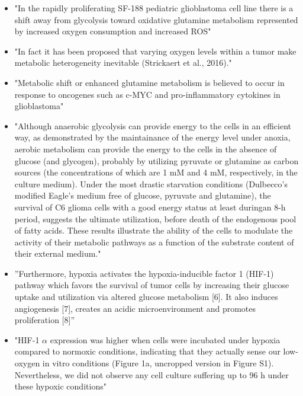 \documentclass[11pt,a4paper]{article}
\begin{document}
\begin{itemize}
\item "In the rapidly proliferating SF-188 pediatric glioblastoma cell line there is a shift away from glycolysis toward oxidative glutamine metabolism represented by increased oxygen consumption and increased ROS"\cite{Strickland2017}

\item "In fact it has been proposed that varying oxygen levels within a tumor make metabolic heterogeneity inevitable (Strickaert et al., 2016)."\cite{Strickland2017}

\item "Metabolic shift or enhanced glutamine metabolism is believed to occur in response to oncogenes such as c-MYC and pro-inflammatory cytokines in glioblastoma" \cite{Stuart2023}

\item "Although anaerobic glycolysis can provide energy to the cells in an efficient way, as demonstrated by the maintainance of the energy level under anoxia, aerobic metabolism can provide the energy to the cells in the absence of glucose (and glycogen), probably by utilizing pyruvate or glutamine as carbon sources (the concentrations of which are 1 mM and 4 mM, respectively, in the culture medium). Under the most drastic starvation conditions (Dulbecco’s modified Eagle’s medium free of glucose, pyruvate and glutamine), the survival of C6 glioma cells with a good energy status at least duringan
8-h period, suggests the ultimate utilization, before death of the endogenous pool of fatty acids. These results illustrate the ability of the cells to modulate the activity of their metabolic pathways as a function of the substrate content of their external medium."\cite{Piannet1991}

\item ”Furthermore, hypoxia activates the hypoxia-inducible factor 1 (HIF-1) pathway which favors the survival of tumor cells by increasing their glucose uptake and utilization via altered glucose metabolism [6]. It also induces angiogenesis [7], creates an acidic microenvironment and promotes proliferation [8]”\cite{Shen2018}

\item "HIF-1 $\alpha$ expression was higher when cells were incubated under hypoxia compared to normoxic conditions, indicating that they actually sense our low-oxygen in vitro conditions (Figure 1a, uncropped version in Figure S1). Nevertheless, we did not observe any cell culture suffering up to 96 h under these hypoxic conditions"\cite{Bailleul2021}


\end{itemize}
\end{document}

